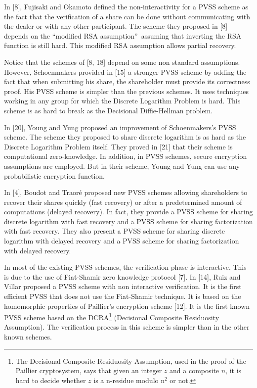 \documentclass[submission,copyright,creativecommons]{eptcs}
\begin{document}
In [8], Fujisaki and Okamoto defined the non-interactivity for a PVSS scheme
as the fact that the verification of a share can be done without
communicating with the dealer or with any other participant. The scheme they
proposed in [8] depends on the \textquotedblleft modified RSA
assumption\textquotedblright\ assuming that inverting the RSA function is
still hard. This modified RSA assumption allows partial recovery.

Notice that the schemes of [8, 18] depend on some non standard assumptions.
However, Schoenmakers provided in [15] a stronger PVSS scheme by adding the
fact that when submitting his share, the shareholder must provide its
correctness proof. His PVSS scheme is simpler than the previous schemes. It
uses techniques working in any group for which the Discrete Logarithm
Problem is hard. This scheme is as hard to break as the Decisional
Diffie-Hellman problem.

In [20], Young and Yung proposed an improvement of Schoenmakers's PVSS scheme.
The scheme they proposed to share discrete logarithm is as hard as the
Discrete Logarithm Problem itself. They proved in [21] that their scheme is
computational zero-knowledge. In addition, in PVSS schemes, secure
encryption assumptions are employed. But in their scheme, Young and Yung can
use any probabilistic encryption function.

In [4], Boudot and Traor\'{e} proposed new PVSS schemes allowing shareholders
to recover their shares quickly (fast recovery) or after a predetermined
amount of computations (delayed recovery). In fact, they provide a PVSS
scheme for sharing discrete logarithm with fast recovery and a PVSS scheme
for sharing factorization with fast recovery. They also present a PVSS
scheme for sharing discrete logarithm with delayed recovery and a PVSS
scheme for sharing factorization with delayed recovery.

In most of the existing PVSS schemes, the verification phase is interactive.
This is due to the use of Fiat-Shamir zero knowledge protocol [7]. In [14],
Ruiz and Villar proposed a PVSS scheme with non interactive verification. It
is the first efficient PVSS that does not use the Fiat-Shamir technique. It
is based on the homomorphic properties of Paillier's encryption scheme [12].
It is the first known PVSS scheme based on the DCRA\footnote{The Decisional Composite Residuosity Assumption, used in the proof of the
Paillier cryptosystem, says that given an integer $z$ and a composite $n$,
it is hard to decide whether $z$ is a n-residue modulo n$^{2}$ or not.}
(Decisional Composite Residuosity Assumption). The verification process in
this scheme is simpler than in the other known schemes.
\end{document}
